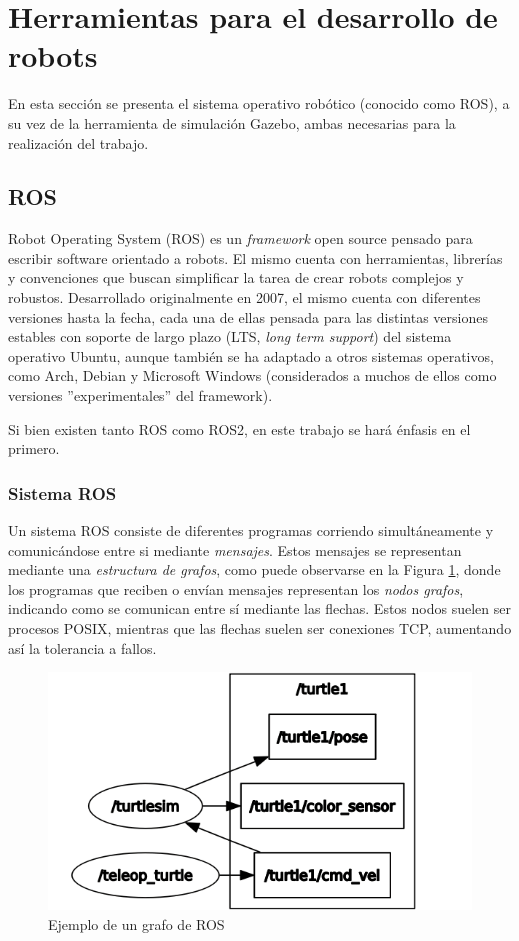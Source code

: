 \section{Herramientas para el desarrollo de robots}
En esta sección se presenta el sistema operativo robótico (conocido como ROS), a su vez de la herramienta de simulación Gazebo, ambas necesarias para la realización del trabajo.

\subsection{ROS}
Robot Operating System (ROS) es un \textit{framework} open source pensado para escribir software orientado a robots. El mismo cuenta con herramientas, librerías y convenciones que buscan simplificar la tarea de crear robots complejos y robustos. Desarrollado originalmente en 2007, el mismo cuenta con diferentes versiones hasta la fecha, cada una de ellas pensada para las distintas versiones estables con soporte de largo plazo (LTS, \textit{long term support}) del sistema operativo Ubuntu, aunque también se ha adaptado a otros sistemas operativos, como Arch, Debian y Microsoft Windows (considerados a muchos de ellos como versiones ''experimentales'' del framework).

Si bien existen tanto ROS como ROS2, en este trabajo se hará énfasis en el primero.

\subsubsection{Sistema ROS}
Un sistema ROS consiste de diferentes programas corriendo simultáneamente y comunicándose entre si mediante \textit{mensajes}. Estos mensajes se representan mediante una \textit{estructura de grafos}, como puede observarse en la Figura \ref{fig:rosgraph}, donde los programas que reciben o envían mensajes representan los \textit{nodos grafos}, indicando como se comunican entre sí mediante las flechas. Estos nodos suelen ser procesos POSIX, mientras que las flechas suelen ser conexiones TCP, aumentando así la tolerancia a fallos.

\begin{figure}[!ht]
    \centering
    \includegraphics[width=\linewidth]{Img/ROSGraph.png}
    \caption{Ejemplo de un grafo de ROS}
    \label{fig:rosgraph}
\end{figure}

